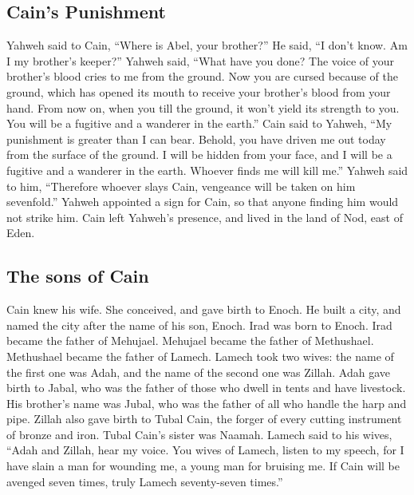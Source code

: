\hypertarget{cains-punishment}{%
\subsection{Cain's Punishment}\label{cains-punishment}}

 Yahweh said to Cain, ``Where is Abel, your brother?'' He
said, ``I don't know. Am I my brother's keeper?''  Yahweh
said, ``What have you done? The voice of your brother's blood cries to
me from the ground.  Now you are cursed because of the
ground, which has opened its mouth to receive your brother's blood from
your hand.  From now on, when you till the ground, it
won't yield its strength to you. You will be a fugitive and a wanderer
in the earth.''  Cain said to Yahweh, ``My punishment is
greater than I can bear.  Behold, you have driven me out
today from the surface of the ground. I will be hidden from your face,
and I will be a fugitive and a wanderer in the earth. Whoever finds me
will kill me.''  Yahweh said to him, ``Therefore whoever
slays Cain, vengeance will be taken on him sevenfold.'' Yahweh appointed
a sign for Cain, so that anyone finding him would not strike him.
 Cain left Yahweh's presence, and lived in the land of
Nod, east of Eden.

\hypertarget{the-sons-of-cain}{%
\subsection{The sons of Cain}\label{the-sons-of-cain}}

 Cain knew his wife. She conceived, and gave birth to
Enoch. He built a city, and named the city after the name of his son,
Enoch.  Irad was born to Enoch. Irad became the father of
Mehujael. Mehujael became the father of Methushael. Methushael became
the father of Lamech.  Lamech took two wives: the name of
the first one was Adah, and the name of the second one was Zillah.
 Adah gave birth to Jabal, who was the father of those
who dwell in tents and have livestock.  His brother's
name was Jubal, who was the father of all who handle the harp and pipe.
 Zillah also gave birth to Tubal Cain, the forger of
every cutting instrument of bronze and iron. Tubal Cain's sister was
Naamah.  Lamech said to his wives, ``Adah and Zillah,
hear my voice. You wives of Lamech, listen to my speech, for I have
slain a man for wounding me, a young man for bruising me.
 If Cain will be avenged seven times, truly Lamech
seventy-seven times.''

